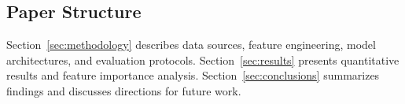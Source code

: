 \subsection{Paper Structure}

Section~\ref{sec:methodology} describes data sources, feature engineering, model
architectures, and evaluation protocols. Section~\ref{sec:results} presents
quantitative results and feature importance analysis. Section~\ref{sec:conclusions}
summarizes findings and discusses directions for future work.
